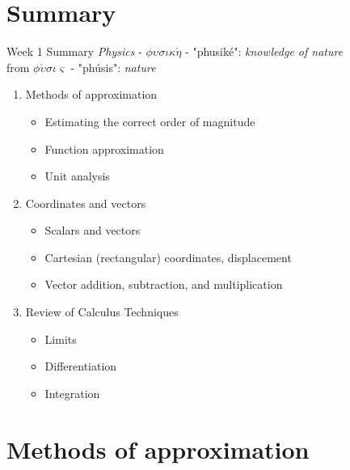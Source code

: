 \documentclass{beamer}
\begin{document}
\section{Summary}

\begin{frame}{Week 1 Summary}
\textit{Physics} - $\phi\upsilon\sigma\iota\kappa\acute{\eta}$ - "phusik\'e": \textit{knowledge of nature} \\
from $\phi\acute{\upsilon}\sigma\iota\varsigma$ - "ph\'usis": \textit{nature}
\begin{enumerate}
\item Methods of approximation
\begin{itemize}
\item \alert{Estimating} the correct order of magnitude
\item \alert{Function} approximation
\item \alert{Unit analysis}
\end{itemize}
\item Coordinates and vectors
\begin{itemize}
\item \alert{Scalars} and \alert{vectors}
\item \alert{Cartesian} (rectangular) coordinates, displacement
\item \alert{Vector} addition, subtraction, and multiplication
\end{itemize}
\item Review of Calculus Techniques
\begin{itemize}
\item Limits
\item Differentiation
\item Integration
\end{itemize}
\end{enumerate}
\end{frame}

\section{Methods of approximation}
\end{document}
